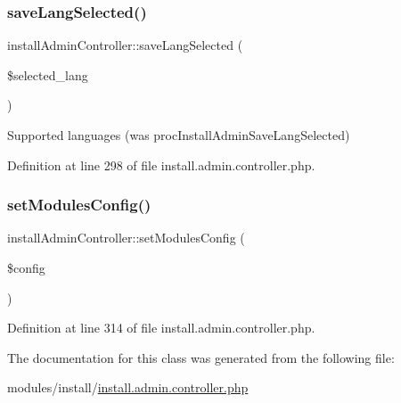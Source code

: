 \subsubsection{\texorpdfstring{save\+Lang\+Selected()}{saveLangSelected()}}
{\footnotesize\ttfamily install\+Admin\+Controller\+::save\+Lang\+Selected (\begin{DoxyParamCaption}\item[{}]{\$selected\+\_\+lang }\end{DoxyParamCaption})}



Supported languages (was proc\+Install\+Admin\+Save\+Lang\+Selected) 



Definition at line 298 of file install.\+admin.\+controller.\+php.

\mbox{\label{classinstallAdminController_ab19d26e4473d9b40a494d5b1f1dbb996}} 
\subsubsection{\texorpdfstring{set\+Modules\+Config()}{setModulesConfig()}}
{\footnotesize\ttfamily install\+Admin\+Controller\+::set\+Modules\+Config (\begin{DoxyParamCaption}\item[{}]{\$config }\end{DoxyParamCaption})}



Definition at line 314 of file install.\+admin.\+controller.\+php.



The documentation for this class was generated from the following file\+:\begin{DoxyCompactItemize}
\item 
modules/install/\hyperlink{install_8admin_8controller_8php}{install.\+admin.\+controller.\+php}\end{DoxyCompactItemize}
